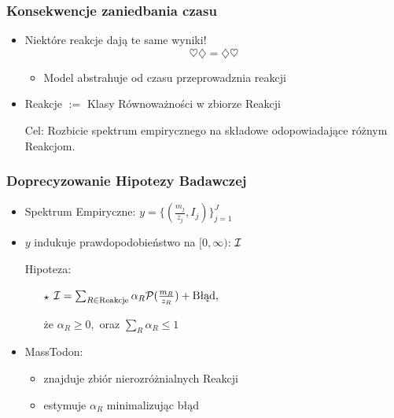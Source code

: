 \documentclass[xetex]{beamer}
\begin{document}

	\begin{frame}\frametitle{Konsekwencje zaniedbania czasu}	
		\begin{itemize}
			
			\item Niektóre reakcje dają te same wyniki!
				$$\heartsuit \diamondsuit = \diamondsuit \heartsuit$$
			
			\begin{itemize}
				\item Model abstrahuje od czasu przeprowadznia reakcji
			\end{itemize}
			
			\item Reakcje $:=$ Klasy Równoważności w zbiorze Reakcji 

			\item[Cel:] Rozbicie spektrum empirycznego na składowe odopowiadające różnym Reakcjom.
		\end{itemize}
	\end{frame}


	\begin{frame}\frametitle{Doprecyzowanie Hipotezy Badawczej} 
		\begin{itemize}
			\item 	Spektrum Empiryczne: $y = \Big\{ (\frac{m_j}{z_j}, I_j) \Big\}_{j = 1}^{J}$
			\item  	$y$ indukuje prawdopodobieństwo na $[0,\infty)$: $\mathcal{I}$
			\item[] Hipoteza:
			\begin{itemize}
				\item[]
				\item[$\star$] $\mathcal{I} = \sum_{R \in \text{Reakcje}} \alpha_R \mathcal{P}(\frac{m_R}{z_R}) + \text{Błąd},$
				\item[]
				\item[że] $\alpha_R \geq 0,$ oraz $\sum_R \alpha_R \leq 1$
			\end{itemize}
			\item[]
			\item 	MassTodon:
			\begin{itemize}
				\item 	znajduje zbiór nierozróżnialnych Reakcji
				\item 	estymuje $\alpha_R$ minimalizując błąd
			\end{itemize}
		\end{itemize}
	\end{frame}
\end{document}
